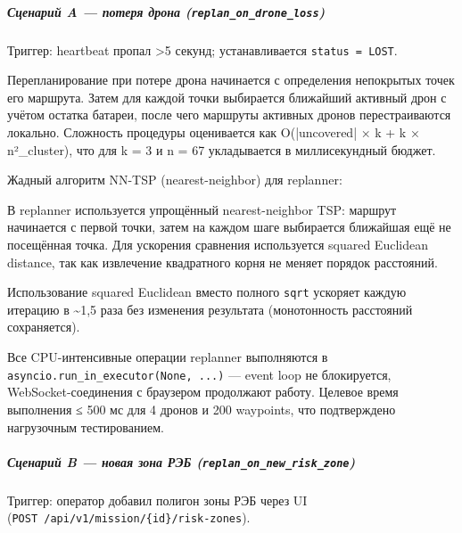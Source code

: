 \documentclass[14pt,a4paper]{extarticle}
\begin{document}
\hypertarget{ux441ux446ux435ux43dux430ux440ux438ux439-a-ux43fux43eux442ux435ux440ux44f-ux434ux440ux43eux43dux430-replan_on_drone_loss}{%
\subparagraph{\texorpdfstring{Сценарий A --- потеря дрона (\texttt{replan\_on\_drone\_loss})}{Сценарий A --- потеря дрона (replan\_on\_drone\_loss)}}\label{ux441ux446ux435ux43dux430ux440ux438ux439-a-ux43fux43eux442ux435ux440ux44f-ux434ux440ux43eux43dux430-replan_on_drone_loss}}

Триггер: heartbeat пропал \textgreater5 секунд; устанавливается \texttt{status\ =\ LOST}.

Перепланирование при потере дрона начинается с определения непокрытых точек его маршрута. Затем для каждой точки выбирается ближайший активный дрон с учётом остатка батареи, после чего маршруты активных дронов перестраиваются локально. Сложность процедуры оценивается как O(|uncovered| × k + k × n²_cluster), что для k = 3 и n = 67 укладывается в миллисекундный бюджет.


Жадный алгоритм NN-TSP (nearest-neighbor) для replanner:

В replanner используется упрощённый nearest-neighbor TSP: маршрут начинается с первой точки, затем на каждом шаге выбирается ближайшая ещё не посещённая точка. Для ускорения сравнения используется squared Euclidean distance, так как извлечение квадратного корня не меняет порядок расстояний.


Использование squared Euclidean вместо полного \texttt{sqrt} ускоряет каждую итерацию в \textasciitilde1,5 раза без изменения результата (монотонность расстояний сохраняется).

Все CPU-интенсивные операции replanner выполняются в \texttt{asyncio.run\_in\_executor(None,\ ...)} --- event loop не блокируется, WebSocket-соединения с браузером продолжают работу. Целевое время выполнения ≤ 500 мс для 4 дронов и 200 waypoints, что подтверждено нагрузочным тестированием.

\hypertarget{ux441ux446ux435ux43dux430ux440ux438ux439-b-ux43dux43eux432ux430ux44f-ux437ux43eux43dux430-ux440ux44dux431-replan_on_new_risk_zone}{%
\subparagraph{\texorpdfstring{Сценарий B --- новая зона РЭБ (\texttt{replan\_on\_new\_risk\_zone})}{Сценарий B --- новая зона РЭБ (replan\_on\_new\_risk\_zone)}}\label{ux441ux446ux435ux43dux430ux440ux438ux439-b-ux43dux43eux432ux430ux44f-ux437ux43eux43dux430-ux440ux44dux431-replan_on_new_risk_zone}}

Триггер: оператор добавил полигон зоны РЭБ через UI (\texttt{POST\ /api/v1/mission/\{id\}/risk-zones}).
\end{document}
